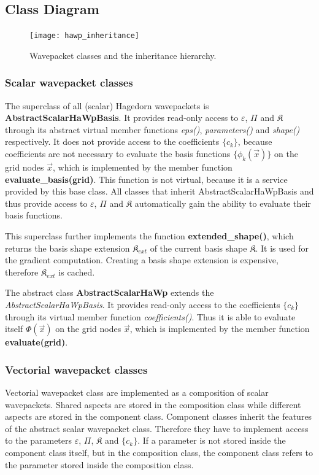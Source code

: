 \documentclass{article}
\def\classname#1{\textit{#1}}
\begin{document}
\subsection{Class Diagram}

\begin{figure}[H]
  \centering
  \texttt{[image: hawp\_inheritance]}
  \caption{Wavepacket classes and the inheritance hierarchy.}
  \label{fig:hawp_inheritance}
\end{figure}

\subsubsection{Scalar wavepacket classes}

The superclass of all (scalar) Hagedorn wavepackets is \textbf{AbstractScalarHaWpBasis}.
It provides read-only access to \(\varepsilon\), \(\Pi\) and \(\mathfrak{K}\)
through its abstract virtual member functions \emph{eps()}, \emph{parameters()} and \emph{shape()}
respectively. It does not provide access to the coefficients \(\{c_k\}\), because coefficients
are not necessary to evaluate the basis functions \(\{\phi_k(\vec{x})\}\) on the grid nodes \(\vec{x}\),
which is implemented by the member function \textbf{evaluate\_basis(grid)}.
This function is not virtual, because it is a service provided by this base class.
All classes that inherit AbstractScalarHaWpBasis and thus provide access to \(\varepsilon\),
\(\Pi\) and \(\mathfrak{K}\) automatically gain the ability to evaluate their basis functions.

This superclass further implements the function \textbf{extended\-\_shape()},
which returns the basis shape extension \(\mathfrak{K}_{ext}\)
of the current basis shape \(\mathfrak{K}\). It is used for the gradient computation.
Creating a basis shape extension is expensive, therefore \(\mathfrak{K}_{ext}\) is cached.

The abstract class \textbf{AbstractScalarHaWp} extends the \classname{AbstractScalarHaWpBasis}.
It provides read-only access to the coefficients \(\{c_k\}\) through its virtual member function
\emph{coefficients()}. Thus it is able to evaluate itself \(\Phi(\vec{x})\) on the grid nodes \(\vec{x}\),
which is implemented by the member function \textbf{evaluate(grid)}.

\subsubsection{Vectorial wavepacket classes}
Vectorial wavepacket class are implemented as a composition of scalar wavepackets.
Shared aspects are stored in the composition class while different aspects are
stored in the component class.
Component classes inherit the features of the abstract scalar wavepacket class.
Therefore they have to implement access to the parameters \(\varepsilon\), \(\Pi\), \(\mathfrak{K}\)
and \(\{c_k\}\).
If a parameter is not stored inside the component class itself, but in the composition class,
the component class refers to the parameter stored inside the composition class.
\end{document}
